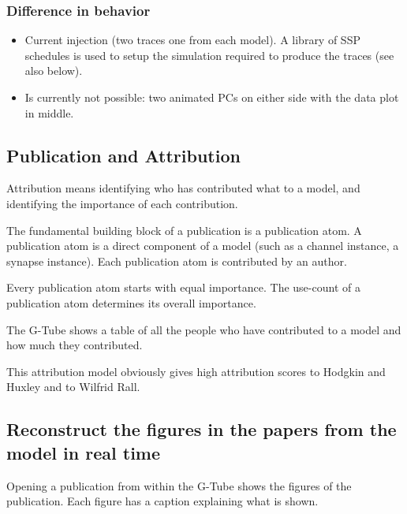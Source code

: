 \documentclass[12pt]{article}
\begin{document}
\subsubsection{Difference in behavior}
\begin{itemize}
\item Current injection (two traces one from each model).  A library
  of SSP schedules is used to setup the simulation required to produce
  the traces (see also below).
\item Is currently not possible: two animated PCs on either side with
  the data plot in middle.
\end{itemize}


\subsection{Publication and Attribution}

Attribution means identifying who has contributed what to a model, and
identifying the importance of each contribution.

The fundamental building block of a publication is a publication atom.
A publication atom is a direct component of a model (such as a channel
instance, a synapse instance).  Each publication atom is contributed
by an author.

Every publication atom starts with equal importance.  The use-count of
a publication atom determines its overall importance.

The G-Tube shows a table of all the people who have contributed to a
model and how much they contributed.

This attribution model obviously gives high attribution scores to
Hodgkin and Huxley and to Wilfrid Rall.




\subsection{Reconstruct the figures in the papers from the model in real time}

Opening a publication from within the G-Tube shows the figures of the
publication.  Each figure has a caption explaining what is shown.
\end{document}
